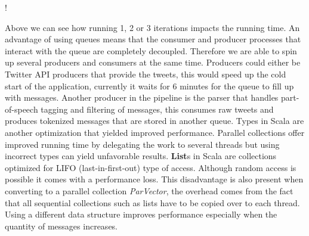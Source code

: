 \resizebox {\columnwidth} {!} {
{
}
}

Above we can see how running 1, 2 or 3 iterations impacts the running time.
\newline
An advantage of using queues means that the consumer and producer processes that interact with the queue are completely decoupled. Therefore we are able to spin up several producers and consumers at the same time. Producers could either be Twitter API producers that provide the tweets, this would speed up the cold start of the application, currently it waits for 6 minutes for the queue to fill up with messages. Another producer in the pipeline is the parser that handles part-of-speech tagging and filtering of messages, this consumes raw tweets and produces tokenized messages that are stored in another queue.
\newline
Types in Scala are another optimization that yielded improved performance. Parallel collections offer improved running time by delegating the work to several threads but using incorrect types can yield unfavorable results. \textbf{List}s in Scala are collections optimized for LIFO (last-in-first-out) type of access. Although random access is possible it comes with a performance loss. This disadvantage is also present when converting to a parallel collection \textit{ParVector}, the overhead comes from the fact that all sequential collections such as lists have to be copied over to each thread. Using a different data structure improves performance especially when the quantity of messages increases.

